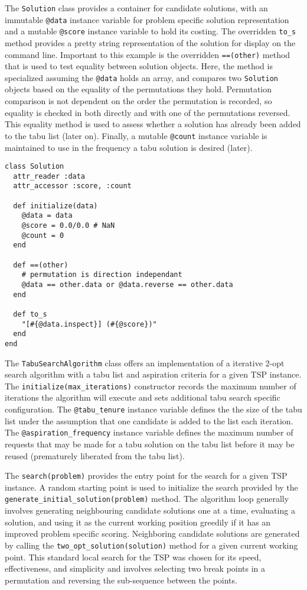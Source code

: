 The \texttt{Solution} class provides a container for candidate solutions, with an immutable \texttt{@data} instance variable for problem specific solution representation and a mutable \texttt{@score} instance variable to hold its costing. The overridden \texttt{to\_s} method provides a pretty string representation of the solution for display on the command line. Important to this example is the overridden \texttt{==(other)} method that is used to test equality between solution objects. Here, the method is specialized assuming the \texttt{@data} holds an array, and compares two \texttt{Solution} objects based on the equality of the permutations they hold. Permutation comparison is not dependent on the order the permutation is recorded, so equality is checked in both directly and with one of the permutations reversed. This equality method is used to assess whether a solution has already been added to the tabu list (later on). Finally, a mutable \texttt{@count} instance variable is maintained to use in the frequency a tabu solution is desired (later). 

\begin{lstlisting}
class Solution
  attr_reader :data
  attr_accessor :score, :count
  
  def initialize(data)
    @data = data
    @score = 0.0/0.0 # NaN
    @count = 0
  end
  
  def ==(other)
    # permutation is direction independant
    @data == other.data or @data.reverse == other.data
  end
  
  def to_s
    "[#{@data.inspect}] (#{@score})"
  end    
end
\end{lstlisting}

The \texttt{TabuSearchAlgorithm} class offers an implementation of a iterative 2-opt search algorithm with a tabu list and aspiration criteria for a given TSP instance. The \texttt{initialize(max\_iterations)} constructor records the maximum number of iterations the algorithm will execute and sets additional tabu search specific configuration. The \texttt{@tabu\_tenure} instance variable defines the the size of the tabu list under the assumption that one candidate is added to the list each iteration. The \texttt{@aspiration\_frequency} instance variable defines the maximum number of requests that may be made for a tabu solution on the tabu list before it may be reused (prematurely liberated from the tabu list).

The \texttt{search(problem)} provides the entry point for the search for a given TSP instance. A random starting point is used to initialize the search provided by the \texttt{generate\_initial\_solution(problem)} method. The algorithm loop generally involves generating neighbouring candidate solutions one at a time, evaluating a solution, and using it as the current working position greedily if it has an improved problem specific scoring. Neighboring candidate solutions are generated by calling the \texttt{two\_opt\_solution(solution)} method for a given current working point. This standard local search for the TSP was chosen for its speed, effectiveness, and simplicity and involves selecting two break points in a permutation and reversing the sub-sequence between the points.

